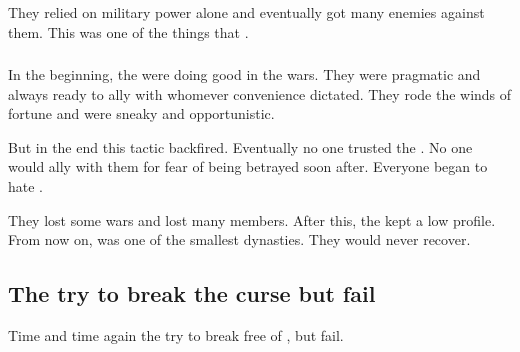 They relied on military power alone and eventually got many enemies against them. 
This was one of the things that . 





\subsubsection{\TiphredSerah}
In the beginning, the \TiphredSerah were doing good in the wars.
They were pragmatic and always ready to ally with whomever convenience dictated.
They rode the winds of fortune and were sneaky and opportunistic. 

But in the end this tactic backfired.
Eventually no one trusted the \TiphredSerah.
No one would ally with them for fear of being betrayed soon after. 
Everyone began to hate \TiphredSerah.

They lost some wars and lost many members.
After this, the kept a low profile. 
From now on, \TiphredSerah was one of the smallest dynasties. 
They would never recover. 









\subsection{The \satharioth{} try to break the curse but fail}
Time and time again the \satharioth{} try to break free of , but fail. 

